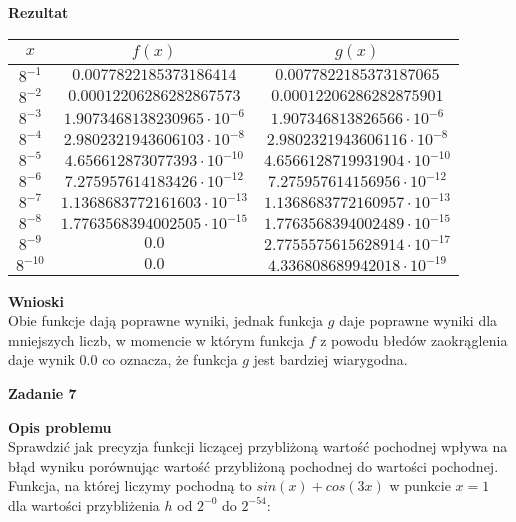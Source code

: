 \documentclass{article}
\begin{document}
\noindent \textbf{Rezultat}

\begin{center}
	\begin{tabular}{|c|c|c|}
		\hline
		\textbf{$x$} & \textbf{$f(x)$}                   & \textbf{$g(x)$}                   \\
		\hline
		$8^{-1}$     & $0.0077822185373186414$           & $0.0077822185373187065$           \\
		\hline
		$8^{-2}$     & $0.00012206286282867573$          & $0.00012206286282875901$          \\
		\hline
		$8^{-3}$     & $1.9073468138230965\cdot10^{-6}$  & $1.907346813826566\cdot10^{-6}$   \\
		\hline
		$8^{-4}$     & $2.9802321943606103\cdot10^{-8}$  & $2.9802321943606116\cdot10^{-8}$  \\
		\hline
		$8^{-5}$     & $4.656612873077393\cdot10^{-10}$  & $4.6566128719931904\cdot10^{-10}$ \\
		\hline
		$8^{-6}$     & $7.275957614183426\cdot10^{-12}$  & $7.275957614156956\cdot10^{-12}$  \\
		\hline
		$8^{-7}$     & $1.1368683772161603\cdot10^{-13}$ & $1.1368683772160957\cdot10^{-13}$ \\
		\hline
		$8^{-8}$     & $1.7763568394002505\cdot10^{-15}$ & $1.7763568394002489\cdot10^{-15}$ \\
		\hline
		$8^{-9}$     & $0.0$                             & $2.7755575615628914\cdot10^{-17}$ \\
		\hline
		$8^{-10}$    & $0.0$                             & $4.336808689942018\cdot10^{-19}$  \\
		\hline
	\end{tabular}
\end{center}

\noindent \textbf{Wnioski} \\
Obie funkcje dają poprawne wyniki, jednak funkcja $g$ daje poprawne wyniki dla mniejszych
liczb, w momencie w którym funkcja $f$ z powodu błedów zaokrąglenia daje wynik $0.0$
co oznacza, że funkcja $g$ jest bardziej wiarygodna.
\pagebreak


\noindent \textbf{\large Zadanie 7}

\noindent \textbf{Opis problemu} \\
Sprawdzić jak precyzja funkcji liczącej przybliżoną wartość pochodnej wpływa na
błąd wyniku porównując wartość przybliżoną pochodnej do wartości pochodnej.
Funkcja, na której liczymy pochodną to $sin(x) + cos(3x)$ w punkcie $x=1$
dla wartości przybliżenia $h$ od $2^{-0}$ do $2^{-54}$:
\end{document}
